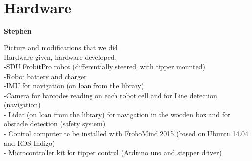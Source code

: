\section{Hardware} %
\label{sec:mr_hardware}

\textbf{Stephen}

Picture and modifications that we did
\\
Hardware given, hardware developed.\\

-SDU FrobitPro robot (differentially steered, with tipper mounted)\\
-Robot battery and charger\\
-IMU for navigation (on loan from the library)\\
-Camera for barcodes reading on each robot cell and for Line detection (navigation)\\
- Lidar (on loan from the library) for navigation in the wooden box and for obstacle detection (safety system)\\
- Control computer to be installed with FroboMind 2015 (based on Ubuntu 14.04 and ROS Indigo)\\
- Microcontroller kit for tipper control (Arduino uno and stepper driver)\\

